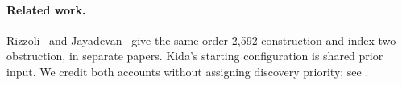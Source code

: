 
\paragraph{Related work.}
Rizzoli~\cite{rizzoli-21-68} and Jayadevan~\cite{jayadevan-21-68}
give the same order-2,592 construction and index-two obstruction, in
separate papers. Kida's starting configuration is shared prior input.
We credit both accounts without assigning discovery priority; see
\comparisonlocation{}.
